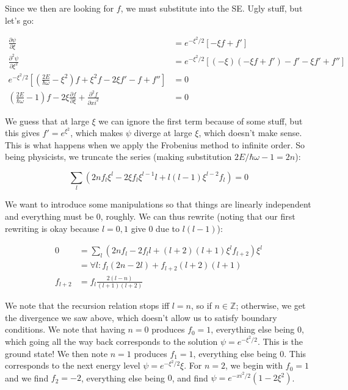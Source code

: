 \documentclass{report}
\begin{document}
Since we then are looking for $f$, we must substitute into the SE. Ugly stuff, but let's go:

\begin{align*}
\frac{\partial \psi}{\partial \xi} &= e^{-\xi^2/2}\left[-\xi f + f'\right]\\
\frac{\partial^2 \psi}{\partial \xi^2} &= e^{-\xi^2/2}\left[(-\xi)(-\xi f + f') - f' - \xi f' + f''\right]\\
e^{-\xi^2/2}\left[\left(\frac{2E}{\hbar\omega}-\xi^2\right)f + \xi^2f-2\xi f' - f + f''\right] &= 0\\
\left(\frac{2E}{\hbar \omega}-1\right)f - 2\xi\frac{\partial f}{\partial \xi} + \frac{\partial^2 f}{\partial xi^2} &= 0
\end{align*}

We guess that at large $\xi$ we can ignore the first term because of some stuff, but this gives $f' = e^{\xi^2}$, which makes $\psi$ diverge at large $\xi$, which doesn't make sense. This is what happens when we apply the Frobenius method to infinite order. So being physicists, we truncate the series (making substitution $2E/\hbar\omega -1 = 2n$):

$$\sum_l\left(2nf_l\xi^l-2\xi f_l\xi^{l-1}l + l(l-1)\xi^{l-2}f_l\right) = 0$$

We want to introduce some manipulations so that things are linearly independent and everything must be $0$, roughly. We can thus rewrite (noting that our first rewriting is okay because $l=0,1$ give $0$ due to $l(l-1)$):

\begin{align*}
0 &= \sum_l\left(2nf_l - 2f_ll + (l+2)(l+1)\xi^lf_{l+2}\right)\xi^l\\
&= \forall l: f_l(2n - 2l) + f_{l+2}(l+2)(l+1)\\
f_{l+2} &= f_l\frac{2(l-n)}{(l+1)(l+2)}
\end{align*}

We note that the recursion relation stops iff $l=n$, so if $n \in \mathbb{Z}$; otherwise, we get the divergence we saw above, which doesn't allow us to satisfy boundary conditions. We note that having $n=0$ produces $f_0 = 1$, everything else being $0$, which going all the way back corresponds to the solution $\psi = e^{-\xi^2/2}$. This is the ground state! We then note $n=1$ produces $f_1 = 1$, everything else being $0$. This corresponds to the next energy level $\psi = e^{-\xi^2/2}\xi$. For $n=2$, we begin with $f_0 = 1$ and we find $f_2 = -2$, everything else being $0$, and find $\psi = e^{-xi^2/2}(1-2\xi^2)$.
\end{document}
